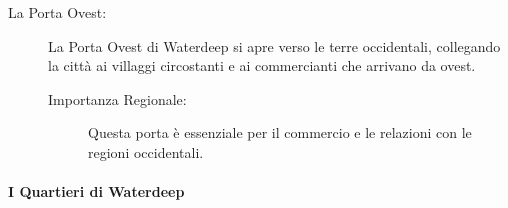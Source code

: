 \documentclass{article}
\begin{document}
\begin{description}
                                \item[La Porta Ovest:] La Porta Ovest di Waterdeep si apre verso le terre occidentali, collegando la città ai villaggi circostanti e ai commercianti che arrivano da ovest.
                                    \begin{description}
                                        \item[Importanza Regionale:] Questa porta è essenziale per il commercio e le relazioni con le regioni occidentali.
                                    \end{description}
                            \end{description}
                          \paragraph{I Quartieri di Waterdeep}
\end{document}
